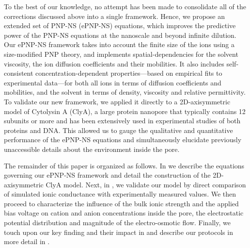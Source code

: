 \documentclass[journal=ancac3,manuscript=article,etalmode=truncate,maxauthors=0,layout=onecolumn]{achemso}
\begin{document}
To the best of our knowledge, no attempt has been made to consolidate all of the corrections discussed above
into a single framework. Hence, we propose an extended set of PNP-NS (ePNP-NS) equations, which improves the
predictive power of the PNP-NS equations at the nanoscale and beyond infinite dilution. Our ePNP-NS framework
takes into account the finite size of the ions using a size-modified PNP theory,\cite{Lu-2011} and implements
spatial-dependencies for the solvent viscosity,\cite{Pronk-2014,Hsu-2017} the ion diffusion coefficients and
their mobilities.\cite{Makarov-1998,Noskov-2004} It also includes self-consistent concentration-dependent
properties---based on empirical fits to experimental data---for both all ions in terms of diffusion
coefficients and mobilities,\cite{Baldessari-2008-1,Mills-1989} and the solvent in terms of density,
viscosity\cite{Hai-Lang-1996} and relative permittivity\cite{Gavish-2016}. To validate our new framework, we
applied it directly to a 2D-axisymmetric model of Cytolysin A (ClyA), a large protein nanopore that typically
contains 12 subunits\cite{Mueller-2009} or more\cite{Soskine-2013} and has been extensively used in
experimental studies of both proteins\cite{Soskine-2013,VanMeervelt-2014,Soskine-Biesemans-2015,
Biesemans-Soskine-2015,Wloka-2017,VanMeervelt-2017,Galenkamp-2018} and DNA.\cite{Franceschini-2013,
Franceschini-2016} This allowed us to gauge the qualitative and quantitative performance of the ePNP-NS
equations and simultaneously elucidate previously unaccessible details about the environment inside the pore.

The remainder of this paper is organized as follows. In \emph{} we describe the equations
governing our ePNP-NS framework and detail the construction of the 2D-axisymmetric ClyA model. Next, in
\emph{}, we validate our model by direct comparison of simulated ionic conductance with
experimentally measured values. We then proceed to characterize the influence of the bulk ionic strength and
the applied bias voltage on cation and anion concentrations inside the pore, the electrostatic potential
distribution and magnitude of the electro-osmotic flow. Finally, we touch upon our key finding and their
impact in \emph{} and describe our protocols in more detail in
\emph{}.
\end{document}
